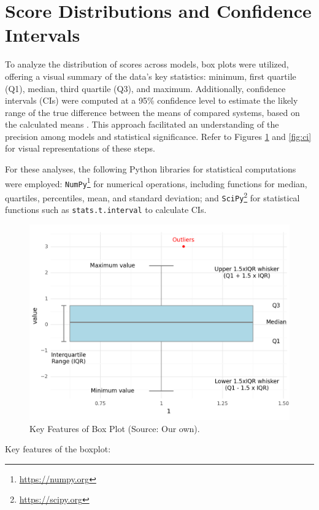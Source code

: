 \section{Score Distributions and Confidence Intervals}

To analyze the distribution of scores across models, box plots were utilized, offering a visual summary of the data's key statistics: minimum, first quartile (Q1), median, third quartile (Q3), and maximum. Additionally, confidence intervals (CIs) were computed at a 95\% confidence level to estimate the likely range of the true difference between the means of compared systems, based on the calculated means \parencite{zhang-vogel-2004-measuring}. This approach facilitated an understanding of the precision among models and statistical significance. Refer to Figures \ref{fig:boxplot} and \ref{fig:ci} for visual representations of these steps.

For these analyses, the following Python libraries for statistical computations were employed: \texttt{NumPy}\footnote{\href{https://numpy.org}{https://numpy.org}} for numerical operations, including functions for median, quartiles, percentiles, mean, and standard deviation; and \texttt{SciPy}\footnote{\href{https://scipy.org}{https://scipy.org}} for statistical functions such as \texttt{stats.t.interval} to calculate CIs.

\begin{figure}[htb]
\centering
\includegraphics[width=.8\textwidth]{textual/Figuras/boxplot-real.png}
\caption{Key Features of Box Plot (Source: Our own).}
\label{fig:boxplot}
\end{figure}

Key features of the boxplot:

